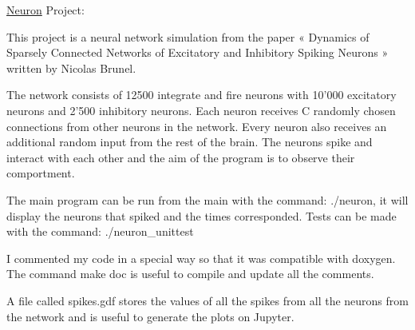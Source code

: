 \hyperlink{classNeuron}{Neuron} Project\-:

This project is a neural network simulation from the paper « Dynamics of Sparsely Connected Networks of Excitatory and Inhibitory Spiking Neurons » written by Nicolas Brunel.

The network consists of 12500 integrate and fire neurons with 10’000 excitatory neurons and 2’500 inhibitory neurons. Each neuron receives C randomly chosen connections from other neurons in the network. Every neuron also receives an additional random input from the rest of the brain. The neurons spike and interact with each other and the aim of the program is to observe their comportment.

The main program can be run from the main with the command\-: ./neuron, it will display the neurons that spiked and the times corresponded. Tests can be made with the command\-: ./neuron\-\_\-unittest

I commented my code in a special way so that it was compatible with doxygen. The command make doc is useful to compile and update all the comments.

A file called spikes.\-gdf stores the values of all the spikes from all the neurons from the network and is useful to generate the plots on Jupyter. 